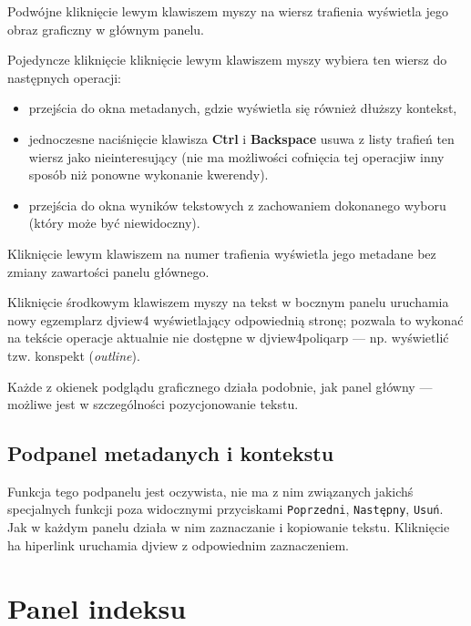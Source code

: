 \documentclass{mwart}
\def\key#1{\textbf{#1}}
\begin{document}
Podwójne kliknięcie lewym klawiszem myszy na wiersz trafienia wyświetla jego obraz
graficzny w głównym panelu.

Pojedyncze kliknięcie kliknięcie lewym klawiszem myszy wybiera ten wiersz do następnych operacji:
\begin{itemize}
\item przejścia do okna metadanych, gdzie wyświetla się również dłuższy kontekst,
\item jednoczesne naciśnięcie klawisza \key{Ctrl} i \key{Backspace}
  usuwa z listy trafień ten wiersz jako nieinteresujący (nie ma
  możliwości cofnięcia tej operacjiw inny sposób niż ponowne wykonanie
  kwerendy).
\item przejścia do okna wyników tekstowych z zachowaniem dokonanego
  wyboru (który może być niewidoczny).
\end{itemize}

Kliknięcie lewym klawiszem na numer trafienia wyświetla jego metadane
bez zmiany zawartości panelu głównego.

Kliknięcie środkowym klawiszem myszy na tekst w bocznym panelu
uruchamia nowy egzemplarz \textsf{djview4} wyświetlający odpowiednią
stronę; pozwala to wykonać na tekście operacje aktualnie nie dostępne
w \textsf{djview4poliqarp} --- np. wyświetlić tzw. konspekt
(\textit{outline}).

Każde z okienek podglądu graficznego działa podobnie, jak panel główny
--- możliwe jest w szczególności pozycjonowanie tekstu.

\subsection{Podpanel metadanych i kontekstu}
\label{sec:podpanel-metadanych-i}

Funkcja tego podpanelu jest oczywista, nie ma z nim związanych jakichś
specjalnych funkcji poza widocznymi przyciskami \texttt{Poprzedni},
\texttt{Następny}, \texttt{Usuń}. Jak w każdym panelu działa w nim
zaznaczanie i kopiowanie tekstu. Kliknięcie ha hiperlink uruchamia
\textsf{djview} z odpowiednim zaznaczeniem.




\section{Panel indeksu}
\label{sec:panel-indeksu}
\end{document}
